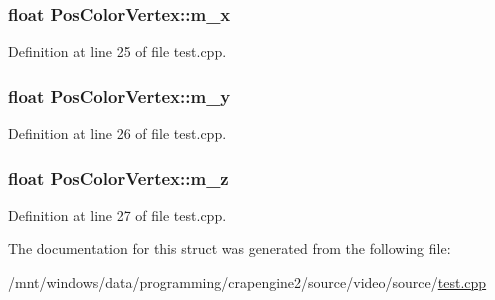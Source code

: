 \subsubsection[{m\+\_\+x}]{\setlength{\rightskip}{0pt plus 5cm}float Pos\+Color\+Vertex\+::m\+\_\+x}\label{struct_pos_color_vertex_ae76dd65e99bcbd4fd79ec0e2c3d0e7af}


Definition at line 25 of file test.\+cpp.

\hypertarget{struct_pos_color_vertex_ad7267f34b67c4df4d93f36cfa155ad30}{}
\subsubsection[{m\+\_\+y}]{\setlength{\rightskip}{0pt plus 5cm}float Pos\+Color\+Vertex\+::m\+\_\+y}\label{struct_pos_color_vertex_ad7267f34b67c4df4d93f36cfa155ad30}


Definition at line 26 of file test.\+cpp.

\hypertarget{struct_pos_color_vertex_ad1c60f507ba3000e2462ac991239bfa9}{}
\subsubsection[{m\+\_\+z}]{\setlength{\rightskip}{0pt plus 5cm}float Pos\+Color\+Vertex\+::m\+\_\+z}\label{struct_pos_color_vertex_ad1c60f507ba3000e2462ac991239bfa9}


Definition at line 27 of file test.\+cpp.



The documentation for this struct was generated from the following file\+:\begin{DoxyCompactItemize}
\item 
/mnt/windows/data/programming/crapengine2/source/video/source/\hyperlink{video_2source_2test_8cpp}{test.\+cpp}\end{DoxyCompactItemize}
